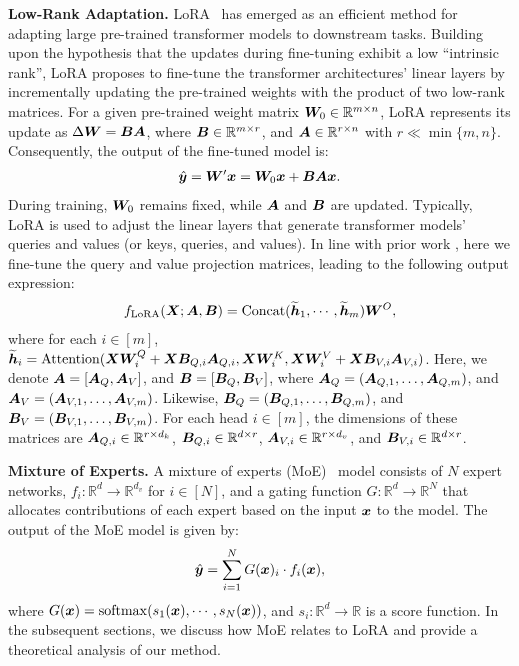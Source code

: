 \vspace{0.5 em}
\noindent
\textbf{Low-Rank Adaptation.} LoRA~\cite{lora} has emerged as an efficient method for adapting large pre-trained transformer models to downstream tasks. Building upon the hypothesis that the updates during fine-tuning exhibit a low ``intrinsic rank'', LoRA proposes to fine-tune the transformer architectures' linear layers by incrementally updating the pre-trained weights with the product of two low-rank matrices. For a given pre-trained weight matrix $\bm{W}_0 \in \mathbb{R}^{m \times n}$, LoRA represents its update as $\Delta \bm{W} = {\bm B} {\bm A}$, where ${\bm B} \in \mathbb{R}^{m \times r}$, and ${\bm A} \in \mathbb{R}^{r \times n}$ with $r \ll \min\{m, n\}$. Consequently, the output of the fine-tuned model is:
\begin{align}
    \hat{{\bm y}} = \bm{W}'{\bm x} = \bm{W}_0 {\bm x} + {\bm B} {\bm A} {\bm x}.
\end{align}
During training, $\bm{W}_0$ remains fixed, while ${\bm A}$ and ${\bm B}$ are updated. Typically, LoRA is used to adjust the linear layers that generate transformer models' queries and values (or keys, queries, and values). In line with prior work \cite{lora, dora, vpetl}, here we fine-tune the query and value projection matrices, leading to the following output expression:
\begin{align}
    f_{\mathrm{LoRA}}({\bm X}; {\bm A}, {\bm B}) = \mathrm{Concat}(\widetilde{{\bm h}}_1, \cdots, \widetilde{{\bm h}}_m)\bm{W}^O, \label{eq:LORA_MSA}
\end{align}
where for each $i \in [m]$, $\widetilde{{\bm h}}_i = \mathrm{Attention}({\bm X} \bm{W}_i^Q + {\bm X} {\bm B}_{Q,i}{\bm A}_{Q,i} , {\bm X} \bm{W}_i^K, {\bm X} \bm{W}_i^V + {\bm X} {\bm B}_{V,i}{\bm A}_{V,i} )$. Here, we denote ${\bm A} = [{\bm A}_Q, {\bm A}_V]$, and ${\bm B} = [{\bm B}_Q, {\bm B}_V]$, where ${\bm A}_Q = ({\bm A}_{Q,1}, \ldots, {\bm A}_{Q,m})$, and ${\bm A}_V = ({\bm A}_{V,1}, \ldots, {\bm A}_{V,m})$. Likewise, ${\bm B}_Q = ({\bm B}_{Q,1}, \ldots, {\bm B}_{Q,m})$, and ${\bm B}_V = ({\bm B}_{V,1}, \ldots, {\bm B}_{V,m})$. For each head $i \in [m]$, the dimensions of these matrices are ${\bm A}_{Q,i} \in \mathbb{R}^{r \times d_{k}}$, ${\bm B}_{Q, i} \in \mathbb{R}^{d \times r}$, ${\bm A}_{V, i} \in \mathbb{R}^{r \times d_{v}}$, and ${\bm B}_{V, i} \in \mathbb{R}^{d \times r}$. 

\vspace{0.5 em}
\noindent
\textbf{Mixture of Experts.} A mixture of experts (MoE)~\cite{Jacob_Jordan-1991, jordan1994hierarchical} model consists of $N$ expert networks, $f_i: \mathbb{R}^d \to \mathbb{R}^{d_v}$ for $i \in [N]$, and a gating function $G: \mathbb{R}^d \to \mathbb{R}^N$ that allocates contributions of each expert based on the input ${\bm x}$ to the model. The output of the MoE model is given by:
\begin{align*}
    \hat{{\bm y}} = \sum^N_{i=1} G({\bm x})_i \cdot f_i({\bm x}),
\end{align*}
where $G({\bm x}) = \mathrm{softmax}(s_1({\bm x}),\cdots, s_N({\bm x}))$, and $s_i: \mathbb{R}^d \to \mathbb{R}$ is a score function. In the subsequent sections, we discuss how MoE relates to LoRA and provide a theoretical analysis of our method.


